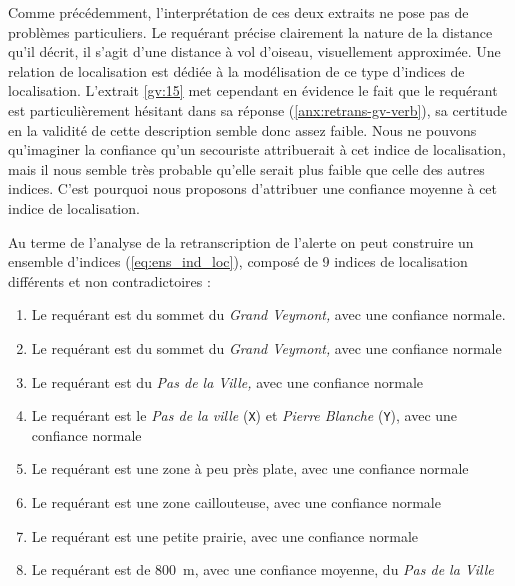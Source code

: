 Comme précédemment, l'interprétation de ces deux extraits ne pose pas
de problèmes particuliers. Le requérant précise clairement la nature
de la distance qu'il décrit, il s'agit d'une distance à vol d'oiseau,
visuellement approximée. Une relation de localisation
 est dédiée à
la modélisation de ce type d'indices de localisation. L'extrait
\ref{gv:15} met cependant en évidence le fait que le requérant est
particulièrement hésitant dans sa réponse
(\autoref{anx:retrans-gv-verb}), sa certitude en la validité de cette
description semble donc assez faible. Nous ne pouvons qu'imaginer la
confiance qu'un secouriste attribuerait à cet indice de localisation,
mais il nous semble très probable qu'elle serait plus faible que celle
des autres indices. C'est pourquoi nous proposons d'attribuer une
confiance moyenne à cet indice de localisation.

Au terme de l'analyse de la retranscription de l'alerte on peut
construire un ensemble d'indices (\autoref{eq:ens_ind_loc}), composé
de 9 indices de localisation différents et non contradictoires :
% 
\begin{enumerate}
\item \label{ind:gv1} Le requérant est
   du sommet du \emph{Grand
    Veymont,} avec une confiance normale.
\item \label{ind:gv2} Le requérant est  du
  sommet du \emph{Grand Veymont,} avec une confiance normale
\item \label{ind:gv3} Le requérant est
   du \emph{Pas de la Ville,} avec
  une confiance normale
\item \label{ind:gv5} Le requérant est  le
  \emph{Pas de la ville} (\texttt{X}) et \emph{Pierre Blanche}
  (\texttt{Y}), avec une confiance normale
\item \label{ind:gv6} Le requérant est 
  une zone à peu près plate, avec une confiance normale
\item \label{ind:gv7} Le requérant est 
  une zone caillouteuse, avec une confiance normale
\item \label{ind:gv8} Le requérant est 
  une petite prairie, avec une confiance normale
\item \label{ind:gv9} Le requérant est
   de \SI{800}{\meter}, avec une
  confiance moyenne, du \emph{Pas de la Ville}
\end{enumerate}

